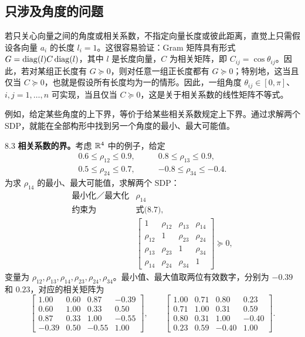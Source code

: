 \subsection{只涉及角度的问题}
若只关心向量之间的角度或相关系数，不指定向量长度或彼此距离，直觉上只需假设各向量 $a_i$ 的长度 $l_i=1$。这很容易验证：Gram 矩阵具有形式 $G=\operatorname{diag}(l)C\operatorname{diag}(l)$，其中 $l$ 是长度向量，$C$ 为相关矩阵，即 $C_{ij}=\cos\theta_{ij}$。因此，若对某组正长度有 $G\succeq0$，则对任意一组正长度都有 $G\succeq0$；特别地，这当且仅当 $C\succeq0$，也就是假设所有长度均为一的情形。因此，一组角度 $\theta_{ij}\in[0,\pi]$、$i,j=1,\ldots,n$ 可实现，当且仅当 $C\succeq0$，这是关于相关系数的线性矩阵不等式。

例如，给定某些角度的上下界，等价于给某些相关系数规定上下界。通过求解两个 SDP，就能在全部构形中找到另一个角度的最小、最大可能值。
\begin{origexample}{8.3}
\textbf{相关系数的界。}考虑 $\mathbb R^4$ 中的例子，给定
\begin{equation}\begin{aligned}
 0.6\leq\rho_{12}\leq0.9,\qquad&0.8\leq\rho_{13}\leq0.9,\\
 0.5\leq\rho_{24}\leq0.7,\qquad&-0.8\leq\rho_{34}\leq-0.4.
\end{aligned}\tag{8.7}\end{equation}
为求 $\rho_{14}$ 的最小、最大可能值，求解两个 SDP：
\[\begin{array}{ll}
 \text{最小化／最大化}&\rho_{14}\\
 \text{约束为}&\text{式(8.7)},\\
 &\begin{bmatrix}1&\rho_{12}&\rho_{13}&\rho_{14}\\
 \rho_{12}&1&\rho_{23}&\rho_{24}\\
 \rho_{13}&\rho_{23}&1&\rho_{34}\\
 \rho_{14}&\rho_{24}&\rho_{34}&1\end{bmatrix}\succeq0,
\end{array}\]
变量为 $\rho_{12},\rho_{13},\rho_{14},\rho_{23},\rho_{24},\rho_{34}$。最小值、最大值取两位有效数字，分别为 $-0.39$ 和 $0.23$，对应的相关矩阵为
\[
 \begin{bmatrix}1.00&0.60&0.87&-0.39\\0.60&1.00&0.33&0.50\\0.87&0.33&1.00&-0.55\\-0.39&0.50&-0.55&1.00\end{bmatrix},\qquad
 \begin{bmatrix}1.00&0.71&0.80&0.23\\0.71&1.00&0.31&0.59\\0.80&0.31&1.00&-0.40\\0.23&0.59&-0.40&1.00\end{bmatrix}.
\]
\end{origexample}
